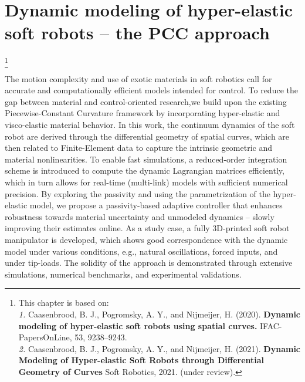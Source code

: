 \graphicspath{{2_Chapter/}}
\chapter{Dynamic modeling of hyper-elastic soft robots -- the PCC approach}
{\let\thefootnote\relax\footnote{{\color{black}This chapter is based on: \\
\textit{1.} Caasenbrood, B. J., Pogromsky, A. Y., and Nijmeijer, H. (2020). \textbf{Dynamic modeling of hyper-elastic soft robots using spatial curves.} IFAC-PapersOnLine, 53, 9238–9243.\\[0.25em] \textit{2.} Caasenbrood, B. J., Pogromsky, A. Y., and Nijmeijer, H. (2021). \textbf{Dynamic Modeling of Hyper-elastic Soft Robots through Differential Geometry of Curves} Soft Robotics, 2021. (under review).
}}}
\label{chap:2}

\begin{chapter-abstract}
The motion complexity and use of exotic materials in soft robotics call for accurate and computationally efficient models intended for control. To reduce the gap between material and control-oriented research,we build upon the existing Piecewise-Constant Curvature framework by incorporating hyper-elastic and visco-elastic material behavior. In this work, the continuum dynamics of the soft robot are derived through the differential geometry of spatial curves, which are then related to Finite-Element data to capture the intrinsic geometric and material nonlinearities. To enable fast simulations, a reduced-order integration scheme is introduced to compute the dynamic Lagrangian matrices efficiently, which in turn allows for real-time (multi-link) models with sufficient numerical precision. By exploring the passivity and using the parametrization of the hyper-elastic model, we propose a passivity-based adaptive controller that enhances robustness towards material uncertainty and unmodeled dynamics -- slowly improving their estimates online. As a study case, a fully 3D-printed soft robot manipulator is developed, which shows good correspondence with the dynamic model under various conditions, e.g., natural oscillations, forced inputs, and under tip-loads. The solidity of the approach is demonstrated through extensive simulations, numerical benchmarks, and experimental validations.
\end{chapter-abstract}

\clearpage
\Materialtrue %
%

%
%
%
%
